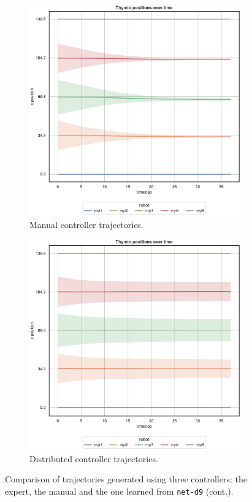 \bigskip
\begin{figure}[!htb]\ContinuedFloat
	\centering
	\begin{subfigure}[h]{0.49\textwidth}
		\centering
		\includegraphics[width=.95\textwidth]{contents/images/net-d9/position-overtime-manual}%
		\caption{Manual controller trajectories.}
	\end{subfigure}
	\hfill
	\begin{subfigure}[h]{0.49\textwidth}
		\centering
		\includegraphics[width=.95\textwidth]{contents/images/net-d9/position-overtime-learned_distributed}
		\caption{Distributed controller trajectories.}
	\end{subfigure}
	\caption[]{Comparison of trajectories generated using three controllers: the 
	expert, the manual and the one learned from \texttt{net-d9} (cont.).}
	\label{fig:net-d9traj}
\end{figure}
